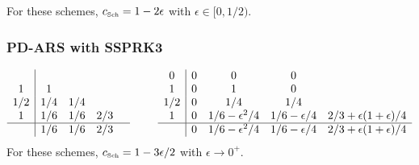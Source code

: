 For these schemes, $c_{\mbox{\tiny Sch}}= 1 - 2\epsilon$ with $\epsilon \in [0, 1/2)$.

\subsubsection{PD-ARS with SSPRK3}
\begin{equation}
  \begin{array}{c | c c c c}
  	    &     &     &     &  \\
  	 1  & 1   &     &     &  \\
  	1/2 & 1/4 & 1/4 &  \\
  	 1  & 1/6 & 1/6 & 2/3 &  \\ \hline
  	    & 1/6 & 1/6 & 2/3 &
  \end{array}
  \qquad
  \begin{array}{c | c c c c}
  	0 & 0 & 0            & 0            \\
  	1 & 0 & 1            & 0            \\
  	1/2 & 0 & 1/4 & 1/4 \\ 
  	1 & 0 & 1/6-\epsilon^2 /4 & 1/6-\epsilon/4 & 2/3+\epsilon(1+\epsilon)/4\\\hline
  	  & 0 & 1/6-\epsilon^2 /4 & 1/6-\epsilon/4 & 2/3+\epsilon(1+\epsilon)/4
  \end{array}
\end{equation}
For these schemes, $c_{\mbox{\tiny Sch}}= 1 - 3\epsilon/2$ with $\epsilon \rightarrow 0^{+}$.